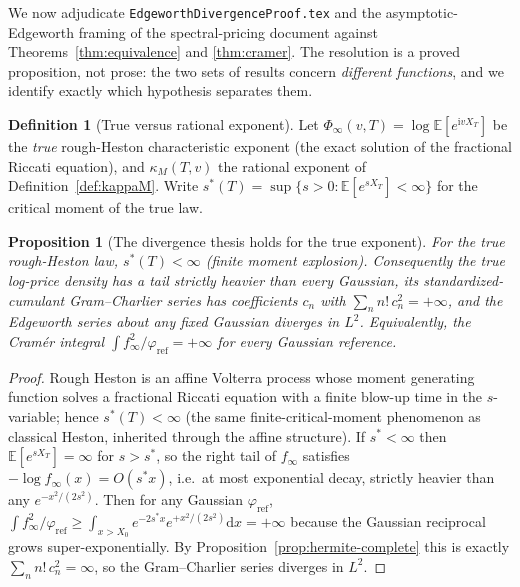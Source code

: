 \documentclass[11pt]{article}
\newcommand{\Ii}{\mathrm{i}}
\newcommand{\dd}{\mathrm{d}}
\theoremstyle{plain}
\newtheorem{proposition}[theorem]{Proposition}
\theoremstyle{definition}
\newtheorem{definition}[theorem]{Definition}
\theoremstyle{remark}
\begin{document}
We now adjudicate \texttt{EdgeworthDivergenceProof.tex} and the asymptotic-Edgeworth
framing of the spectral-pricing document against Theorems~\ref{thm:equivalence} and
\ref{thm:cramer}. The resolution is a proved proposition, not prose: the two sets
of results concern \emph{different functions}, and we identify exactly which
hypothesis separates them.

\begin{definition}[True versus rational exponent]\label{def:true-vs-rational}
Let $\Phi_\infty(v,T)=\log\mathbb E[e^{\Ii vX_T}]$ be the \emph{true} rough-Heston
characteristic exponent (the exact solution of the fractional Riccati equation),
and $\kappa_M(T,v)$ the rational exponent of Definition~\ref{def:kappaM}. Write
$s^\ast(T)=\sup\{s>0:\mathbb E[e^{sX_T}]<\infty\}$ for the critical moment of the
true law.
\end{definition}

\begin{proposition}[The divergence thesis holds for the true exponent]
\label{prop:divergence}
For the true rough-Heston law, $s^\ast(T)<\infty$ (finite moment explosion). 
Consequently the true log-price density has a tail strictly heavier than every
Gaussian, its standardized-cumulant Gram--Charlier series has coefficients $c_n$
with $\sum_n n!\,c_n^2=+\infty$, and the Edgeworth series about any fixed Gaussian
\emph{diverges} in $L^2$. Equivalently, the Cramér integral
$\int f_\infty^2/\varphi_{\mathrm{ref}}=+\infty$ for every Gaussian reference.
\end{proposition}
\begin{proof}
Rough Heston is an affine Volterra process whose moment generating function solves a
fractional Riccati equation with a finite blow-up time in the $s$-variable; hence
$s^\ast(T)<\infty$ (the same finite-critical-moment phenomenon as classical Heston,
inherited through the affine structure). If $s^\ast<\infty$ then
$\mathbb E[e^{sX_T}]=\infty$ for $s>s^\ast$, so the right tail of $f_\infty$
satisfies $-\log f_\infty(x)=O(s^\ast x)$, i.e.\ at most exponential decay, strictly
heavier than any $e^{-x^2/(2s^2)}$. Then for any Gaussian $\varphi_{\mathrm{ref}}$,
$\int f_\infty^2/\varphi_{\mathrm{ref}}\ge\int_{x>X_0}e^{-2s^\ast x}
e^{+x^2/(2s^2)}\dd x=+\infty$ because the Gaussian reciprocal grows super-exponentially.
By Proposition~\ref{prop:hermite-complete} this is exactly $\sum_n n!\,c_n^2=\infty$,
so the Gram--Charlier series diverges in $L^2$. 
\end{proof}
\end{document}
